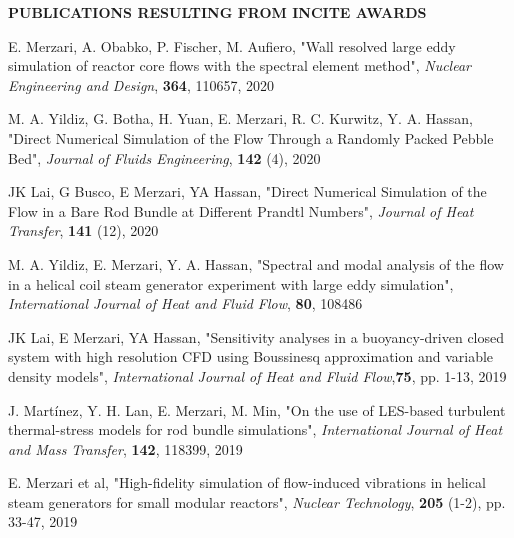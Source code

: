 \documentclass[11pt,letterpaper,english]{article}
\begin{document}
\setlength{\parindent}{0in} %


\pagestyle{fancy}   \renewcommand{%
\headrulewidth}{0.0pt}

\begin{center}
\bf {PUBLICATIONS RESULTING FROM INCITE AWARDS} \\
\end{center}
\vspace{-.25in}

E. Merzari, A. Obabko, P. Fischer, M. Aufiero, "Wall resolved large eddy simulation of reactor core flows with the spectral element method", \textit{Nuclear Engineering and Design}, \textbf{364}, 110657, 2020

M. A. Yildiz, G. Botha, H. Yuan, E. Merzari, R. C. Kurwitz, Y. A. Hassan, "Direct Numerical Simulation of the Flow Through a Randomly Packed Pebble Bed", \textit{Journal of Fluids Engineering}, \textbf{142} (4), 2020

JK Lai, G Busco, E Merzari, YA Hassan, "Direct Numerical Simulation of the Flow in a Bare Rod Bundle at Different Prandtl Numbers", \textit{Journal of Heat Transfer},  \textbf{141} (12), 2020

M. A. Yildiz, E. Merzari, Y. A. Hassan, "Spectral and modal analysis of the flow in a helical coil steam generator experiment with large eddy simulation", \textit{International Journal of Heat and Fluid Flow},  \textbf{80}, 108486

JK Lai, E Merzari, YA Hassan, "Sensitivity analyses in a buoyancy-driven closed system with high resolution CFD using Boussinesq approximation and variable density models", \textit{International Journal of Heat and Fluid Flow},\textbf{75}, pp. 1-13, 2019

J. Martínez, Y. H. Lan, E. Merzari, M. Min, "On the use of LES-based turbulent thermal-stress models for rod bundle simulations", \textit{International Journal of Heat and Mass Transfer}, \textbf{142}, 118399, 2019

E. Merzari et al, "High-fidelity simulation of flow-induced vibrations in helical steam generators for small modular reactors", \textit{Nuclear Technology}, \textbf{205} (1-2), pp. 33-47, 2019
\end{document}
